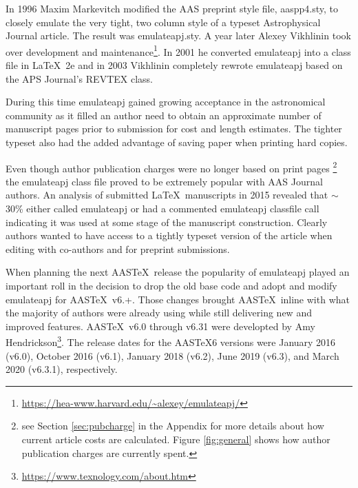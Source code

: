 \documentclass[linenumbers,trackchanges]{aastex7}
\newcommand\aastex{AAS\TeX}
\newcommand\latex{La\TeX}
\begin{document}
In 1996 Maxim Markevitch modified the AAS preprint style file, aaspp4.sty,
to closely emulate the very tight, two column style of a typeset
Astrophysical Journal article.  The result was emulateapj.sty. A year
later Alexey Vikhlinin took over development and maintenance\footnote{\url{https://hea-www.harvard.edu/~alexey/emulateapj/}}. In 2001 he
converted emulateapj into a class file in \latex\ 2e and in 2003 Vikhlinin
completely rewrote emulateapj based on the APS Journal's REVTEX class.

During this time emulateapj gained growing acceptance in the astronomical
community as it filled an author need to obtain an approximate number of
manuscript pages prior to submission for cost and length estimates. The
tighter typeset also had the added advantage of saving paper when printing 
hard copies.

\begin{figure*}[ht!]
\caption{The AAS journals are operated as a nonprofit venture, and author charges fairly recapture costs for the services provided in the publishing process. The chart above breaks down the services that author charges go toward. The AAS Journals' Business Model is outlined in a \href{https://aas.org/posts/news/2023/08/aas-open-access-publishing-model-open-transparent-and-fair}{2023 post}.
\label{fig:general}}
\end{figure*}

Even though author publication charges were no longer based on print pages
\footnote{see Section \ref{sec:pubcharge} in the Appendix for more details
about how current article costs are calculated. Figure \ref{fig:general} shows
how author publication charges are currently spent.} the emulateapj class file
proved to be extremely popular with AAS Journal authors.  An 
analysis of submitted \latex\ manuscripts in 2015 revealed that $\sim$30\%
either called emulateapj or had a commented emulateapj classfile call
indicating it was used at some stage of the manuscript construction.
Clearly authors wanted to have access to a tightly typeset version of the
article when editing with co-authors and for preprint submissions.

When planning the next \aastex\ release the popularity of emulateapj played
an important roll in the decision to drop the old base code and adopt and
modify emulateapj for \aastex\ v6.+.  Those changes brought \aastex\
inline with what the majority of authors were already using while still
delivering new and improved features.  \aastex\ v6.0 through v6.31 were
developted by Amy Hendrickson\footnote{\url{https://www.texnology.com/about.htm}}.
The release dates for the \aastex 6 versions were January 2016 (v6.0),
October 2016 (v6.1), January 2018 (v6.2), June 2019 (v6.3), and March 2020
(v6.3.1), respectively.
\end{document}
